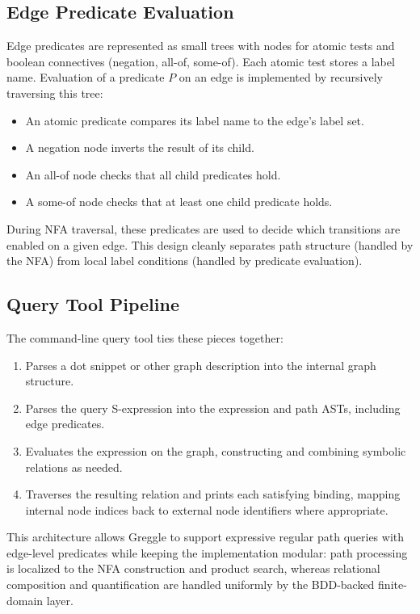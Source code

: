 \documentclass[11pt]{article}
\begin{document}
\subsection*{Edge Predicate Evaluation}

Edge predicates are represented as small trees with nodes for atomic tests and boolean connectives (negation, all-of, some-of). Each atomic test stores a label name. Evaluation of a predicate $P$ on an edge is implemented by recursively traversing this tree:
\begin{itemize}[leftmargin=*]
  \item An atomic predicate compares its label name to the edge's label set.
  \item A negation node inverts the result of its child.
  \item An all-of node checks that all child predicates hold.
  \item A some-of node checks that at least one child predicate holds.
\end{itemize}

During NFA traversal, these predicates are used to decide which transitions are enabled on a given edge. This design cleanly separates path structure (handled by the NFA) from local label conditions (handled by predicate evaluation).

\subsection*{Query Tool Pipeline}

The command-line query tool ties these pieces together:
\begin{enumerate}[leftmargin=*]
  \item Parses a dot snippet or other graph description into the internal graph structure.
  \item Parses the query S-expression into the expression and path ASTs, including edge predicates.
  \item Evaluates the expression on the graph, constructing and combining symbolic relations as needed.
  \item Traverses the resulting relation and prints each satisfying binding, mapping internal node indices back to external node identifiers where appropriate.
\end{enumerate}

This architecture allows Greggle to support expressive regular path queries with edge-level predicates while keeping the implementation modular: path processing is localized to the NFA construction and product search, whereas relational composition and quantification are handled uniformly by the BDD-backed finite-domain layer.
\end{document}
